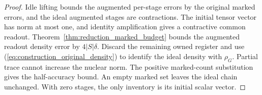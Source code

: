 \begin{proof}\leanok
    Idle lifting bounds the augmented per-stage errors by the original
    marked errors, and the ideal augmented stages are contractions.
    The initial tensor vector has norm at most one, and identity
    amplification gives a contractive common readout.
    Theorem~\ref{thm:reduction_marked_budget} bounds the augmented readout
    density error by $4|S|\delta$. Discard the remaining owned register
    and use (\ref{eq:construction_original_density}) to identify the
    ideal density with $\rho_G$. Partial trace cannot increase the
    nuclear norm. The positive marked-count substitution gives the
    half-accuracy bound.
    An empty marked set leaves the ideal chain unchanged. With zero
    stages, the only inventory is its initial scalar vector.
\end{proof}
